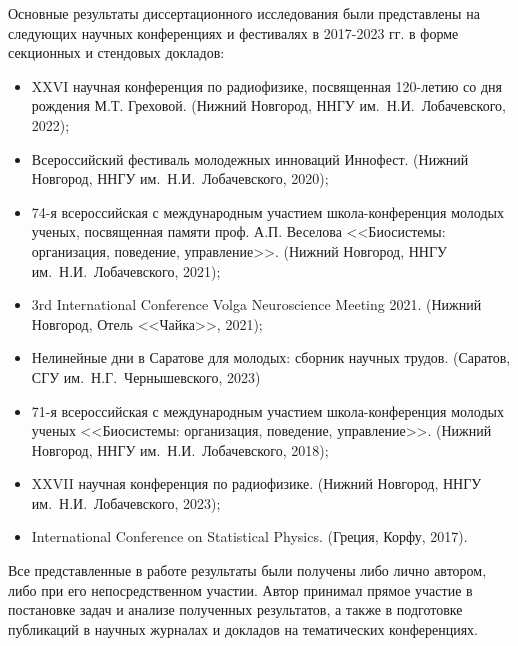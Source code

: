 {\probation}
Основные результаты диссертационного исследования были представлены на следующих научных конференциях и фестивалях в 2017-2023 гг. в форме секционных и стендовых докладов:
\begin{itemize}
    \item XXVI научная конференция по радиофизике, посвященная 120-летию со дня рождения М.Т. Греховой. (Нижний Новгород, ННГУ им.~Н.И.~Лобачевского, 2022);
    \item Всероссийский фестиваль молодежных инноваций Иннофест. (Нижний Новгород, ННГУ им.~Н.И.~Лобачевского, 2020);
    \item 74-я всероссийская с международным участием школа-конференция молодых ученых, посвященная памяти проф. А.П. Веселова <<Биосистемы: организация, поведение, управление>>. (Нижний Новгород, ННГУ им.~Н.И.~Лобачевского, 2021);
    \item 3rd International Conference Volga Neuroscience Meeting 2021. (Нижний Новгород, Отель <<Чайка>>, 2021);
    \item Нелинейные дни в Саратове для молодых: сборник научных трудов. (Саратов, СГУ им.~Н.Г.~Чернышевского, 2023)
    \item 71-я всероссийская с международным участием школа-конференция молодых ученых <<Биосистемы: организация, поведение, управление>>. (Нижний Новгород, ННГУ им.~Н.И.~Лобачевского, 2018);
    \item XXVII научная конференция по радиофизике. (Нижний Новгород, ННГУ им.~Н.И.~Лобачевского, 2023);
    \item International Conference on Statistical Physics. (Греция, Корфу, 2017).
\end{itemize}


{\contribution} Все представленные в работе результаты были получены либо лично автором, либо при его непосредственном участии. Автор принимал прямое участие в постановке задач и анализе полученных результатов, а также в подготовке публикаций в научных журналах и докладов на тематических конференциях.

